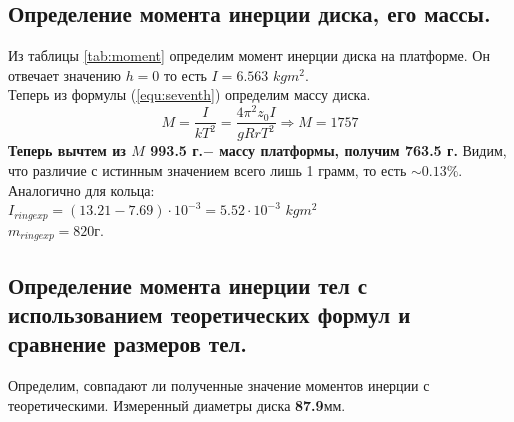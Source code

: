 \documentclass[12pt,a4paper]{article}
\begin{document}
\newpage
\begin{minipage}[h]{0.69\textwidth}
\end{minipage}
\newpage		

 \subsection{Определение момента инерции диска, его массы.}
Из таблицы \ref{tab:moment} определим момент инерции диска на платформе. Он отвечает значению $h=0$ то есть $I=6.563$ $kgm^2$.\\
Теперь из формулы (\ref{equ:seventh}) определим массу диска.
\begin{displaymath}
M=\frac{I}{kT^2}=\frac{4\pi^2z_{0}I}{gRrT^2}\Rightarrow M= 1757
\end{displaymath}
\textbf{Теперь вычтем из $M$ 993.5 г.$-$ массу платформы, получим 763.5 г.} Видим, что различие с истинным значением всего лишь 1 грамм, то есть $\sim0.13\%$.\\
Аналогично для кольца:\\
 $I_{ring exp}=(13.21-7.69)\cdot10^{-3}=5.52\cdot10^{-3}$ $kgm^2$\\
$m_{ring exp}=820$г.


      \subsection{Определение момента инерции тел с использованием теоретических формул и сравнение размеров тел.}
Определим, совпадают ли полученные значение моментов инерции с теоретическими. Измеренный диаметры диска \textbf{87.9}мм.
	
\end{document}
